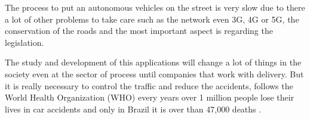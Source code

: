The process to put an autonomous vehicles on the street is very slow due to there a lot of other problems to take care such as the network even 3G, 4G or 5G, the conservation of the roads and the most important aspect is regarding the legislation. 

The study and development of this applications will change a lot of things in the society even at the sector of process until companies that work with delivery. But it is really necessary to control the traffic and reduce the accidents, follows the World Health Organization (WHO) every years over 1 million people lose their lives in car accidents and only in Brazil it is over than 47,000 deaths \cite{world2004world}. 
